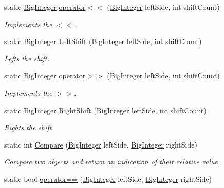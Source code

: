 \begin{DoxyCompactItemize}
static \hyperlink{class_scott_garland_1_1_big_integer}{Big\+Integer} \hyperlink{class_scott_garland_1_1_big_integer_af1e7806be3cb647088bf461b03052fc4}{operator$<$$<$} (\hyperlink{class_scott_garland_1_1_big_integer}{Big\+Integer} left\+Side, int shift\+Count)
\begin{DoxyCompactList}\small\item\em Implements the $<$$<$. \end{DoxyCompactList}\item 
static \hyperlink{class_scott_garland_1_1_big_integer}{Big\+Integer} \hyperlink{class_scott_garland_1_1_big_integer_a1d2dd59a7603d7ceaecbf2b1c51bf7bd}{Left\+Shift} (\hyperlink{class_scott_garland_1_1_big_integer}{Big\+Integer} left\+Side, int shift\+Count)
\begin{DoxyCompactList}\small\item\em Lefts the shift. \end{DoxyCompactList}\item 
static \hyperlink{class_scott_garland_1_1_big_integer}{Big\+Integer} \hyperlink{class_scott_garland_1_1_big_integer_a9353164b18bcdd76a5abf016025f419e}{operator$>$$>$} (\hyperlink{class_scott_garland_1_1_big_integer}{Big\+Integer} left\+Side, int shift\+Count)
\begin{DoxyCompactList}\small\item\em Implements the $>$$>$. \end{DoxyCompactList}\item 
static \hyperlink{class_scott_garland_1_1_big_integer}{Big\+Integer} \hyperlink{class_scott_garland_1_1_big_integer_a736003e9128e125c4800c63f6c1b0073}{Right\+Shift} (\hyperlink{class_scott_garland_1_1_big_integer}{Big\+Integer} left\+Side, int shift\+Count)
\begin{DoxyCompactList}\small\item\em Rights the shift. \end{DoxyCompactList}\item 
static int \hyperlink{class_scott_garland_1_1_big_integer_a3724ad4d98940f216c8abce7834d5bf4}{Compare} (\hyperlink{class_scott_garland_1_1_big_integer}{Big\+Integer} left\+Side, \hyperlink{class_scott_garland_1_1_big_integer}{Big\+Integer} right\+Side)
\begin{DoxyCompactList}\small\item\em Compare two objects and return an indication of their relative value. \end{DoxyCompactList}\item 
static bool \hyperlink{class_scott_garland_1_1_big_integer_a55ec557dd4fe3895e28f8e02473ad5c9}{operator==} (\hyperlink{class_scott_garland_1_1_big_integer}{Big\+Integer} left\+Side, \hyperlink{class_scott_garland_1_1_big_integer}{Big\+Integer} right\+Side)

\end{DoxyCompactItemize}
